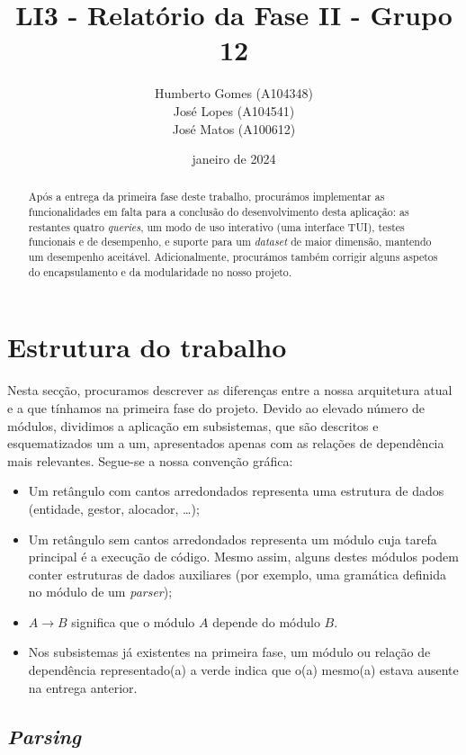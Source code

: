 \documentclass[11pt, a4paper]{article}
\title{\textbf{LI3 - Relatório da Fase II - Grupo 12}}
\author{
    Humberto Gomes (A104348) \\
    José Lopes     (A104541) \\
    José Matos     (A100612) \\
}
\date{janeiro de 2024}
\begin{document}
\maketitle
\setlength{\parskip}{\baselineskip}
\setlength{\parindent}{0pt}

\begin{abstract}
    Após a entrega da primeira fase deste trabalho, procurámos implementar as funcionalidades em
    falta para a conclusão do desenvolvimento desta aplicação: as restantes quatro \emph{queries},
    um modo de uso interativo (uma interface TUI), testes funcionais e de desempenho, e suporte
    para um \emph{dataset} de maior dimensão, mantendo um desempenho aceitável. Adicionalmente,
    procurámos também corrigir alguns aspetos do encapsulamento e da modularidade no nosso projeto.
\end{abstract}

\section{Estrutura do trabalho}

Nesta secção, procuramos descrever as diferenças entre a nossa arquitetura atual e a que tínhamos
na primeira fase do projeto. Devido ao elevado número de módulos, dividimos a aplicação em
subsistemas, que são descritos e esquematizados um a um, apresentados apenas com as relações de
dependência mais relevantes. Segue-se a nossa convenção gráfica:

\begin{itemize}
    \item Um retângulo com cantos arredondados representa uma estrutura de dados (entidade,
          gestor, alocador, \ldots);
    \item Um retângulo sem cantos arredondados representa um módulo cuja tarefa principal é a
          execução de código. Mesmo assim, alguns destes módulos podem conter estruturas de dados
          auxiliares (por exemplo, uma gramática definida no módulo de um \emph{parser});
    \item $A \rightarrow B$ significa que o módulo $A$ depende do módulo $B$.
    \item Nos subsistemas já existentes na primeira fase, um módulo ou relação de dependência
          representado(a) a {\color{ForestGreen}verde} indica que o(a) mesmo(a) estava ausente na
          entrega anterior.
\end{itemize}

\subsection{\emph{Parsing}}
\label{sec:parsing}
\end{document}

